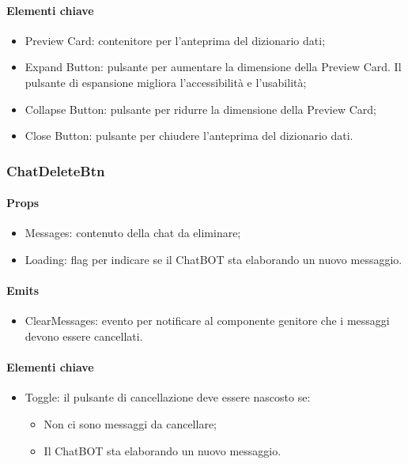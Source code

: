 \paragraph*{Elementi chiave}
\begin{itemize}
  \item Preview Card: contenitore per l'anteprima del dizionario dati;
  \item Expand Button: pulsante per aumentare la dimensione della Preview Card. Il pulsante di espansione migliora l'accessibilità e l'usabilità;
  \item Collapse Button: pulsante per ridurre la dimensione della Preview Card;
  \item Close Button: pulsante per chiudere l'anteprima del dizionario dati.
\end{itemize}

\subsubsection{ChatDeleteBtn}

\paragraph*{Props}
\begin{itemize}
  \item Messages: contenuto della chat da eliminare;
  \item Loading: flag per indicare se il ChatBOT sta elaborando un nuovo messaggio.
\end{itemize}

\paragraph*{Emits}
\begin{itemize}
  \item ClearMessages: evento per notificare al componente genitore che i messaggi devono essere cancellati.
\end{itemize}

\paragraph*{Elementi chiave}
\begin{itemize}
  \item Toggle: il pulsante di cancellazione deve essere nascosto se:
  \begin{itemize}
    \item Non ci sono messaggi da cancellare;
    \item Il ChatBOT sta elaborando un nuovo messaggio.
  \end{itemize}
\end{itemize}

